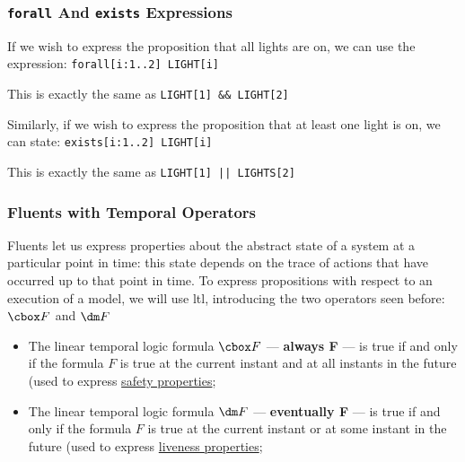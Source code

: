 \subsubsection{\texttt{forall} And \texttt{exists} Expressions}\label{sub:an_forall_and_exists_expressions} %
If we wish to express the proposition that all lights are on, we can use the expression: \texttt{forall[i:1..2] LIGHT[i]}
\begin{note}
    This is exactly the same as \texttt{LIGHT[1] \&\& LIGHT[2]}
\end{note}
Similarly, if we wish to express the proposition that at least one light is on, we can state: \texttt{exists[i:1..2] LIGHT[i]}
\begin{note}
    This is exactly the same as \texttt{LIGHT[1] || LIGHTS[2]}
\end{note}
%
\subsubsection{Fluents with Temporal Operators}\label{sub:an_fluents_with_temporal_operators} %
Fluents let us express properties about the abstract state of a system at a particular point in time: this state depends on the trace of actions that have occurred up to that point in time.
\emptyln{}
To express propositions with respect to an execution of a model, we will use \ac{ltl}, introducing the two operators seen before: $\cbox F$ and $\dm F$
\begin{itemize}
    \item The linear temporal logic formula $\cbox F$ --- \textbf{always F} --- is true if and only if the formula $F$ is true at the current instant and at all instants in the future (used to express \hyperref[def:safety-prop]{safety properties};
    \item The linear temporal logic formula $\dm F$ --- \textbf{eventually F} --- is true if and only if the formula $F$ is true at the current instant or at some instant in the future (used to express \hyperref[def:liveness-prop]{liveness properties};
\end{itemize}
%
